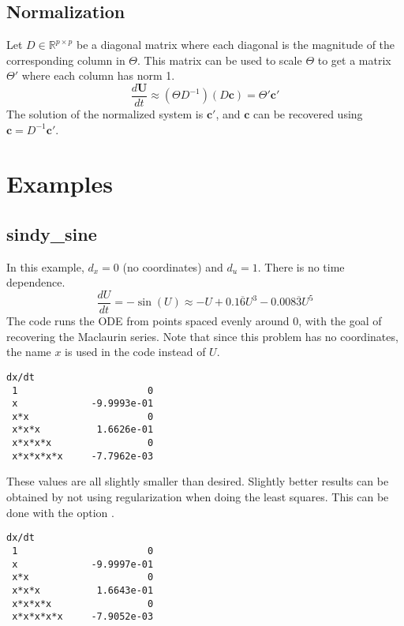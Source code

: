 \documentclass{article}
\let\vec\mathbf
\def\real{\mathbb{R}}
\def\lstinline#1{}%
\begin{document}
\subsection{Normalization}

Let $D \in \real^{p \times p}$ be a diagonal matrix where each diagonal is the magnitude of the
corresponding column in $\Theta$. This matrix can be used to scale $\Theta$ to
get a matrix $\Theta'$ where each column has norm 1.
\begin{equation}\label{eq:normalized-system}
\frac{d\vec{U}}{dt} \approx (\Theta D^{-1}) (D\vec{c}) = \Theta' \vec{c'}
\end{equation}
The solution of the normalized system is $\vec{c'}$, and $\vec{c}$ can be
recovered using $\vec{c} = D^{-1} \vec{c'}$.

\pagebreak
\section{Examples}

\subsection{sindy\_sine}
In this example, $d_x = 0$ (no coordinates) and $d_u = 1$. There is no time dependence.
\begin{equation*}
\frac{dU}{dt} = -\sin(U) \approx -U + 0.1\overline{6}U^3 - 0.008\overline{3}U^5
\end{equation*}
The code runs the ODE from points spaced evenly around 0, with the goal of
recovering the Maclaurin series. Note that since this problem has no
coordinates, the name $x$ is used in the code instead of $U$.
\begin{lstlisting}[language={}]
                    dx/dt
 1                       0
 x             -9.9993e-01
 x*x                     0
 x*x*x          1.6626e-01
 x*x*x*x                 0
 x*x*x*x*x     -7.7962e-03
\end{lstlisting}
These values are all slightly smaller than desired. Slightly better results can
be obtained by not using regularization when doing the least squares. This can
be done with the option \lstinline{-tao_brgn_regularizer_weight 0}.
\begin{lstlisting}[language={}]
                    dx/dt
 1                       0
 x             -9.9997e-01
 x*x                     0
 x*x*x          1.6643e-01
 x*x*x*x                 0
 x*x*x*x*x     -7.9052e-03
\end{lstlisting}
\end{document}
